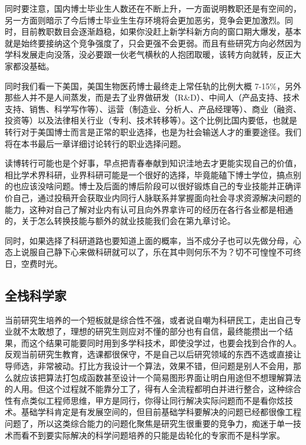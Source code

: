 \documentclass[]{tufte-book}
\begin{document}
同时要注意，国内博士毕业生人数还在不断上升，一方面说明教职还是有空间的，另一方面则暗示了今后博士毕业生生存环境将会更加恶劣，竞争会更加激烈。同时，目前教职数目会逐渐趋稳，如果你没赶上新学科新方向的窗口期大爆发，基本就是始终要接纳这个竞争强度了，只会更强不会更弱。而且有些研究方向必然因为学科发展走向没落，没必要跟一伙老气横秋的人抱团取暖，该转方向就转，反正大家都没基础。

同时我们看一下美国，美国生物医药博士最终走上常任轨的比例大概 7-15\%，另外那些人并不是人间蒸发，而是去了业界做研发（R\&D）、中间人（产品支持、技术支持、销售、科学写作等）、运营（制造业、分析人、产品经理等）、商业（融资、投资等）以及法律相关行业（专利、技术转移等）。这个比例比国内要低，也就是转行对于美国博士而言是正常的职业选择，也是为社会输送人才的重要途径。我们将在本书最后一章详细讨论转行的职业选择问题。

读博转行可能也是个好事，早点把青春奉献到知识洼地去才更能实现自己的价值，相比学术界科研，业界科研可能是一个很好的选择，毕竟能磕下博士学位，搞点别的也应该没啥问题。博士及后面的博后阶段可以很好锻炼自己的专业技能并正确评价自己，通过投稿开会获取业内同行人脉联系并掌握面向社会寻求资源解决问题的能力，这种对自己了解对业内有认可且向外界拿许可的经历在各行各业都是相通的，关于怎么转换技能与额外的就业技能我们会在第九章讨论。

同时，如果选择了科研道路也要知道上面的概率，当不成分子也可以先做分母，心态上说服自己静下心来做科研就可以了，乐在其中则何乐不为？切不可惶惶不可终日，空费时光。

\hypertarget{ux5168ux6808ux79d1ux5b66ux5bb6}{%
\subsection{全栈科学家}\label{ux5168ux6808ux79d1ux5b66ux5bb6}}

当前研究生培养的一个短板就是综合性不强，或者说自嘲为科研民工，走出自己专业就不太敢想了，理想的研究生则应对不懂的部分也有自信，最终能攒出一个结果，而这个结果可能要同时用到多学科技术，即使没学过，也要会找到合作的人。反观当前研究生教育，选课都很保守，不是自己以后研究领域的东西不选或直接让导师选，非常被动。打比方我设计一个算法，效果不错，但问题是别人不会用，那么就应该把算法打包成函数甚至设计一个简易图形界面让明白用途但不想理解算法的人用。但这个过程就不能靠分工了，得有人全流程都明白并进行整合，这种综合性有点类似工程师思维，甲方是同行，你得让同行解决实际问题而不是看你炫技术。基础学科肯定是有发展空间的，但目前基础学科要解决的问题已经都很像工程问题了，所以这类综合能力的问题化聚焦是研究生很重要的竞争力，痴迷于单一技术而看不到要实际解决的科学问题培养的只能是齿轮化的专家而不是科学家。
\end{document}
